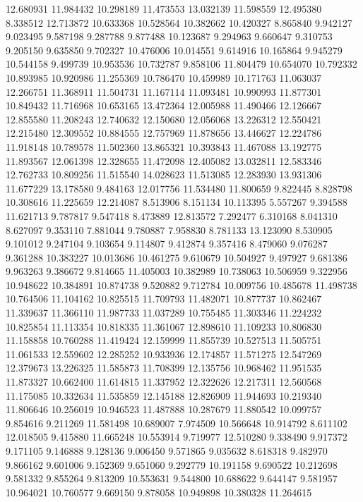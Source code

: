 12.680931
11.984432
10.298189
11.473553
13.032139
11.598559
12.495380
8.338512
12.713872
10.633368
10.528564
10.382662
10.420327
8.865840
9.942127
9.023495
9.587198
9.287788
9.877488
10.123687
9.294963
9.660647
9.310753
9.205150
9.635850
9.702327
10.476006
10.014551
9.614916
10.165864
9.945279
10.544158
9.499739
10.953536
10.732787
9.858106
11.804479
10.654070
10.792332
10.893985
10.920986
11.255369
10.786470
10.459989
10.171763
11.063037
12.266751
11.368911
11.504731
11.167114
11.093481
10.990993
11.877301
10.849432
11.716968
10.653165
13.472364
12.005988
11.490466
12.126667
12.855580
11.208243
12.740632
12.150680
12.056068
13.226312
12.550421
12.215480
12.309552
10.884555
12.757969
11.878656
13.446627
12.224786
11.918148
10.789578
11.502360
13.865321
10.393843
11.467088
13.192775
11.893567
12.061398
12.328655
11.472098
12.405082
13.032811
12.583346
12.762733
10.809256
11.515540
14.028623
11.513085
12.283930
13.931306
11.677229
13.178580
9.484163
12.017756
11.534480
11.800659
9.822445
8.828798
10.308616
11.225659
12.214087
8.513906
8.151134
10.113395
5.557267
9.394588
11.621713
9.787817
9.547418
8.473889
12.813572
7.292477
6.310168
8.041310
8.627097
9.353110
7.881044
9.780887
7.958830
8.781133
13.123090
8.530905
9.101012
9.247104
9.103654
9.114807
9.412874
9.357416
8.479060
9.076287
9.361288
10.383227
10.013686
10.461275
9.610679
10.504927
9.497927
9.681386
9.963263
9.386672
9.814665
11.405003
10.382989
10.738063
10.506959
9.322956
10.948622
10.384891
10.874738
9.520882
9.712784
10.009756
10.485678
11.498738
10.764506
11.104162
10.825515
11.709793
11.482071
10.877737
10.862467
11.339637
11.366110
11.987733
11.037289
10.755485
11.303346
11.224232
10.825854
11.113354
10.818335
11.361067
12.898610
11.109233
10.806830
11.158858
10.760288
11.419424
12.159999
11.855739
10.527513
11.505751
11.061533
12.559602
12.285252
10.933936
12.174857
11.571275
12.547269
12.379673
13.226325
11.585873
11.708399
12.135756
10.968462
11.951535
11.873327
10.662400
11.614815
11.337952
12.322626
12.217311
12.560568
11.175085
10.332634
11.535859
12.145188
12.826909
11.944693
10.219340
11.806646
10.256019
10.946523
11.487888
10.287679
11.880542
10.099757
9.854616
9.211269
11.581498
10.689007
7.974509
10.566648
10.914792
8.611102
12.018505
9.415880
11.665248
10.553914
9.719977
12.510280
9.338490
9.917372
9.171105
9.146888
9.128136
9.006450
9.571865
9.035632
8.618318
9.482970
9.866162
9.601006
9.152369
9.651060
9.292779
10.191158
9.690522
10.212698
9.581332
9.855264
9.813209
10.553631
9.544800
10.688622
9.644147
9.581957
10.964021
10.760577
9.669150
9.878058
10.949898
10.380328
11.264615
